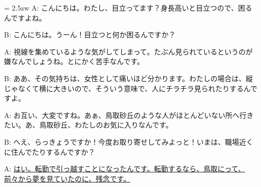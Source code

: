 \documentclass[11pt]{amsart}
\title{}
\author{}
\newenvironment{hangall}[1]{\hangindent = 2.5zw\everypar{\hangindent = 2.5zw}}{}
\begin{document}
\maketitle
\begin{hangall}{}%
A: こんにちは。わたし、目立ってます？身長高いと目立つので、困るんですよね。

B: こんにちは。うーん！目立つと何か困るんですか？

A: 視線を集めているような気がしてしまって。たぶん見られているというのが嫌なんでしょうね。とにかく苦手なんです。

B: ああ、その気持ちは、女性として痛いほど分かります。わたしの場合は、縦じゃなくて横に大きいので、そういう意味で、人にチラチラ見られたりするんですよ。

A: お互い、大変ですね。あぁ、鳥取砂丘のような人がほとんどいない所へ行きたい。あ、鳥取砂丘、わたしのお気に入りなんです。

B: へえ、らっきょうですか！今度お取り寄せしてみよっと！いまは、職場近くに住んでたりするんですか？

A: \ul{はい。転勤で引っ越すことになったんです。転勤するなら、鳥取にって、前々から夢を見ていたのに、残念です。}\end{hangall}
\end{document}
